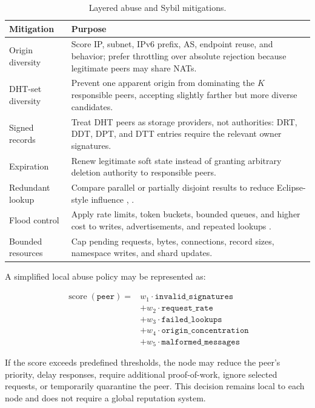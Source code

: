 \documentclass[
  12pt,
  oneside,
  a4paper,
  chapter=TITLE,
  section=TITLE,
  english,
  brazil
]{abntex2}
\begin{document}
\begin{table}[H]
\centering
\caption{Layered abuse and Sybil mitigations.}
\label{tab:abuse-mitigations}
\begin{tabularx}{\textwidth}{L{0.25\textwidth} Y}
\toprule
\textbf{Mitigation} & \textbf{Purpose} \\
\midrule
Origin diversity & Score IP, subnet, IPv6 prefix, AS, endpoint reuse, and behavior; prefer throttling over absolute rejection because legitimate peers may share NATs. \\
DHT-set diversity & Prevent one apparent origin from dominating the $K$ responsible peers, accepting slightly farther but more diverse candidates. \\
Signed records & Treat DHT peers as storage providers, not authorities: DRT, DDT, DPT, and DTT entries require the relevant owner signatures. \\
Expiration & Renew legitimate soft state instead of granting arbitrary deletion authority to responsible peers. \\
Redundant lookup & Compare parallel or partially disjoint results to reduce Eclipse-style influence \cite{baumgart2007skademlia}, \cite{castro2002secure}. \\
Flood control & Apply rate limits, token buckets, bounded queues, and higher cost to writes, advertisements, and repeated lookups \cite{rfc2697}. \\
Bounded resources & Cap pending requests, bytes, connections, record sizes, namespace writes, and shard updates. \\
\bottomrule
\end{tabularx}
\end{table}

A simplified local abuse policy may be represented as:

\[
\begin{aligned}
\operatorname{score}(\texttt{peer}) ={}&
w_1 \cdot \texttt{invalid\_signatures} \\
&+ w_2 \cdot \texttt{request\_rate} \\
&+ w_3 \cdot \texttt{failed\_lookups} \\
&+ w_4 \cdot \texttt{origin\_concentration} \\
&+ w_5 \cdot \texttt{malformed\_messages}
\end{aligned}
\]

If the score exceeds predefined thresholds, the node may reduce the peer's priority,
delay responses, require additional proof-of-work, ignore selected requests, or
temporarily quarantine the peer. This decision remains local to each node and does
not require a global reputation system.
\end{document}
